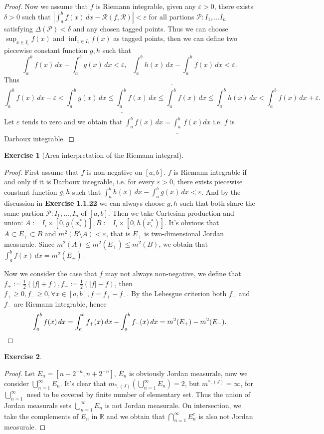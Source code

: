 \documentclass{article}
\newtheorem{ex}{Exercise}[subsection]
\begin{document}
\begin{proof}
Now we assume that $f$ is Riemann integrable, given any $\varepsilon > 0$, there exists $\delta > 0$ such that
$|\int_a^b f(x)\, dx - \mathcal{R}(f, \mathcal{R})| < \varepsilon$ for all partions $\mathcal{P}: I_1, \dots I_n$ 
satisfying $\Delta(\mathcal{P}) < \delta$ and any chosen tagged points. Thus we can choose $\sup_{x \in I_i} f(x)$
and $\inf_{x \in I_i} f(x)$ as tagged points, then we can define two piecewise constant function $g, h$ such that
$$
\int_a^b f(x)\, dx - \int_a^b g(x)\, dx < \varepsilon,\ \ \ \int_a^b h(x)\, dx - \int_a^b f(x)\, dx < \varepsilon.
$$Thus$$
\int_a^b f(x)\, dx - \varepsilon < \int_a^b g(x)\, dx \leq \underline{\int_a^b} f(x)\, dx \leq 
\overline{\int_a^b} f(x)\, dx \leq \int_a^b h(x)\, dx < \int_a^b f(x)\, dx + \varepsilon.
$$
Let $\varepsilon$ tends to zero and we obtain that $\overline{\int_a^b} f(x)\, dx = \underline{\int_a^b}\, f(x) dx$
i.e. $f$ is Darboux integrable.
\end{proof}

\setcounter{ex}{24}
\begin{ex}[Area interpretation of the Riemann integral]\end{ex}
\begin{proof}
First assume that $f$ is non-negative on $[a, b]$. $f$ is Riemann integrable if and only if it is Darboux integrable,
i.e. for every $\varepsilon > 0$, there exists piecewise constant function $g, h$ such that 
$\int_a^b h(x)\, dx - \int_a^b g(x)\, dx < \varepsilon$. And by the discussion in {\bfseries Exercise 1.1.22} we can 
always choose $g, h$ such that both share the same partion $\mathcal{P}: I_1, \dots, I_n$ of $[a, b]$. Then we take
Cartesian production and union: $A := I_i \times [0, g(x_i^*)], B:= I_i \times [0, h(x_i^*)]$. It's obvious that
$A \subset E_+ \subset B$ and $m^2(B \setminus A) < \varepsilon$, that is $E_+$ is two-dimensional Jordan measurale.
Since $m^2(A) \leq m^2(E_+) \leq m^2(B)$, we obtain that $\int_a^b f(x)\, dx = m^2(E_+)$.

Now we consider the case that $f$ may not always non-negative, we define that $f_+ := \frac{1}{2}(|f| + f),
f_- := \frac{1}{2}(|f| - f)$, then $f_+ \geq 0, f_- \geq 0, \forall x \in [a, b], f = f_+ - f_-$. By the Lebesgue
criterion both $f_+$ and $f_-$ are Riemann integrable, hence \[
\int_a^b f(x)\, dx = \int_a^b f_+(x)\, dx - \int_a^b f_-(x)\, dx = m^2(E_+) - m^2(E_-). \qedhere
\]
\end{proof}

\begin{ex}\end{ex}
\begin{proof}
Let $E_n = [n - 2^{-n}, n + 2^{-n}]$, $E_n$ is obviously Jordan measurale, now we consider $\bigcup_{n = 1}^\infty E_n$.
It's clear that $m_{*, (J)}(\bigcup_{n = 1}^\infty E_n) = 2$, but $m^{*, (J)} = \infty$, for $\bigcup_{n = 1}^\infty$
need to be covered by finite number of elementary set. Thus the union of Jordan measurale sets $\bigcup_{n = 1}^\infty E_n$
is not Jordan measurale. On intersection, we take the complements of $E_n$ in $\mathbb{R}$ and we obtain that 
$\bigcap_{n = 1}^\infty E_n^c$ is also not Jordan measurale.
\end{proof}
\end{document}
